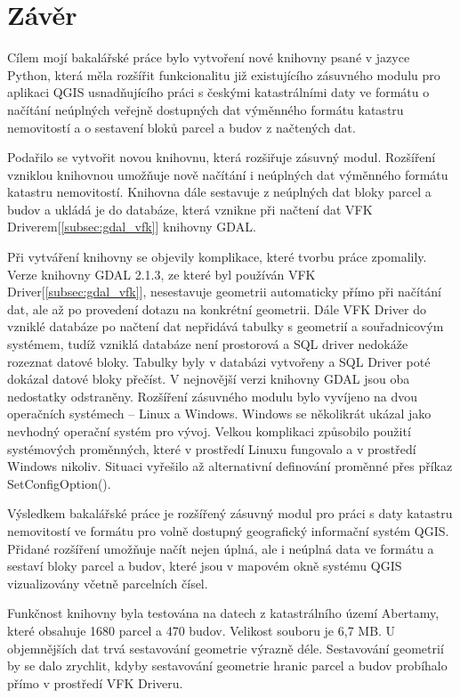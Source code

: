 \chapter{Závěr}
\label{5-zaver}
Cílem mojí bakalářské práce bylo vytvoření nové knihovny psané v
jazyce Python, která měla rozšířit funkcionalitu již existujícího
zásuvného modulu pro aplikaci QGIS usnadňujícího práci s českými
katastrálními daty ve formátu  o načítání neúplných veřejně
dostupných dat výměnného formátu katastru nemovitostí a o sestavení
bloků parcel a budov z načtených dat.

Podařilo se vytvořit novou knihovnu, která rozšiřuje zásuvný
modul. Rozšíření vzniklou knihovnou umožňuje nově načítání i neúplných
dat výměnného formátu katastru nemovitostí. Knihovna dále sestavuje z
neúplných dat bloky parcel a budov a ukládá je do databáze, která
vznikne při načtení dat VFK Driverem[\ref{subsec:gdal_vfk}] knihovny
GDAL.

Při vytváření knihovny se objevily komplikace, které tvorbu práce
zpomalily. Verze knihovny GDAL 2.1.3, ze které byl používán VFK
Driver[\ref{subsec:gdal_vfk}], nesestavuje geometrii automaticky přímo
při načítání dat, ale až po provedení dotazu na konkrétní
geometrii. Dále VFK Driver do vzniklé databáze po načtení dat
nepřidává tabulky s geometrií a souřadnicovým systémem, tudíž vzniklá
databáze není prostorová a SQL driver nedokáže rozeznat datové
bloky. Tabulky byly v databázi vytvořeny a SQL Driver poté dokázal
datové bloky přečíst. V nejnovější verzi knihovny GDAL jsou oba
nedostatky odstraněny. Rozšíření zásuvného modulu bylo vyvíjeno na
dvou operačních systémech -- Linux a Windows. Windows se několikrát
ukázal jako nevhodný operační systém pro vývoj. Velkou komplikaci
způsobilo použití systémových proměnných, které v prostředí Linuxu
fungovalo a v prostředí Windows nikoliv. Situaci vyřešilo až
alternativní definování proměnné přes příkaz SetConfigOption().

Výsledkem bakalářské práce je rozšířený zásuvný modul pro práci s daty
katastru nemovitostí ve formátu  pro volně dostupný
geografický informační systém QGIS. Přidané rozšíření umožňuje načít
nejen úplná, ale i neúplná data ve formátu  a sestaví bloky
parcel a budov, které jsou v mapovém okně systému QGIS vizualizovány
včetně parcelních čísel.

Funkčnost knihovny byla testována na datech z katastrálního území
Abertamy, které obsahuje 1680 parcel a 470 budov. Velikost 
souboru je 6,7 MB. U objemnějších dat trvá sestavování geometrie
výrazně déle. Sestavování geometrií by se dalo zrychlit, kdyby
sestavování geometrie hranic parcel a budov probíhalo přímo v
prostředí VFK Driveru.


